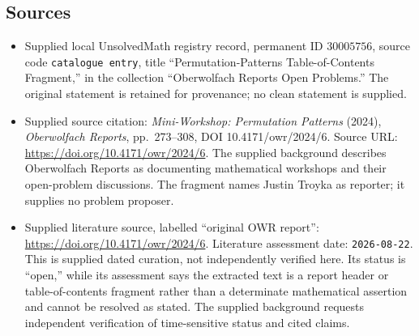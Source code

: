 \documentclass[11pt]{article}
\begin{document}
\subsection{Sources}
\begin{itemize}
\item Supplied local UnsolvedMath registry record, permanent ID \(30005756\), source code \texttt{catalogue entry}, title ``Permutation-Patterns Table-of-Contents Fragment,'' in the collection ``Oberwolfach Reports Open Problems.'' The original statement is retained for provenance; no clean statement is supplied.
\item Supplied source citation: \emph{Mini-Workshop: Permutation Patterns} (2024), \emph{Oberwolfach Reports}, pp.\ 273--308, DOI 10.4171/owr/2024/6. Source URL: \url{https://doi.org/10.4171/owr/2024/6}. The supplied background describes Oberwolfach Reports as documenting mathematical workshops and their open-problem discussions. The fragment names Justin Troyka as reporter; it supplies no problem proposer.
\item Supplied literature source, labelled ``original OWR report'': \url{https://doi.org/10.4171/owr/2024/6}. Literature assessment date: \texttt{2026-08-22}. This is supplied dated curation, not independently verified here. Its status is ``open,'' while its assessment says the extracted text is a report header or table-of-contents fragment rather than a determinate mathematical assertion and cannot be resolved as stated. The supplied background requests independent verification of time-sensitive status and cited claims.
\end{itemize}
\end{document}
